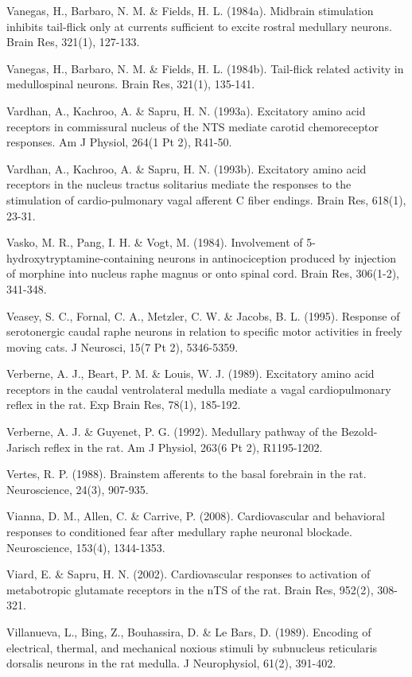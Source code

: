 \documentclass[a4paper,12pt,twoside]{report}
\begin{document}
\begin{singlespacing}
\begin{footnotesize}
Vanegas, H., Barbaro, N. M. \& Fields, H. L. (1984a). Midbrain stimulation inhibits tail-flick only at currents sufficient to excite rostral medullary neurons. Brain Res, 321(1), 127-133.

Vanegas, H., Barbaro, N. M. \& Fields, H. L. (1984b). Tail-flick related activity in medullospinal neurons. Brain Res, 321(1), 135-141.

Vardhan, A., Kachroo, A. \& Sapru, H. N. (1993a). Excitatory amino acid receptors in commissural nucleus of the NTS mediate carotid chemoreceptor responses. Am J Physiol, 264(1 Pt 2), R41-50.

Vardhan, A., Kachroo, A. \& Sapru, H. N. (1993b). Excitatory amino acid receptors in the nucleus tractus solitarius mediate the responses to the stimulation of cardio-pulmonary vagal afferent C fiber endings. Brain Res, 618(1), 23-31.

Vasko, M. R., Pang, I. H. \& Vogt, M. (1984). Involvement of 5-hydroxytryptamine-containing neurons in antinociception produced by injection of morphine into nucleus raphe magnus or onto spinal cord. Brain Res, 306(1-2), 341-348.

Veasey, S. C., Fornal, C. A., Metzler, C. W. \& Jacobs, B. L. (1995). Response of serotonergic caudal raphe neurons in relation to specific motor activities in freely moving cats. J Neurosci, 15(7 Pt 2), 5346-5359.

Verberne, A. J., Beart, P. M. \& Louis, W. J. (1989). Excitatory amino acid receptors in the caudal ventrolateral medulla mediate a vagal cardiopulmonary reflex in the rat. Exp Brain Res, 78(1), 185-192.

Verberne, A. J. \& Guyenet, P. G. (1992). Medullary pathway of the Bezold-Jarisch reflex in the rat. Am J Physiol, 263(6 Pt 2), R1195-1202.

Vertes, R. P. (1988). Brainstem afferents to the basal forebrain in the rat. Neuroscience, 24(3), 907-935.

Vianna, D. M., Allen, C. \& Carrive, P. (2008). Cardiovascular and behavioral responses to conditioned fear after medullary raphe neuronal blockade. Neuroscience, 153(4), 1344-1353.

Viard, E. \& Sapru, H. N. (2002). Cardiovascular responses to activation of metabotropic glutamate receptors in the nTS of the rat. Brain Res, 952(2), 308-321.

Villanueva, L., Bing, Z., Bouhassira, D. \& Le Bars, D. (1989). Encoding of electrical, thermal, and mechanical noxious stimuli by subnucleus reticularis dorsalis neurons in the rat medulla. J Neurophysiol, 61(2), 391-402.


\end{footnotesize}
\end{singlespacing}
\end{document}
